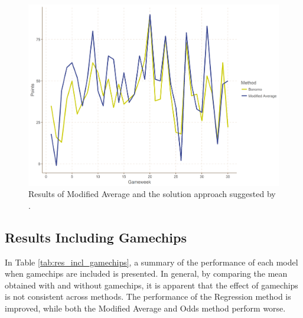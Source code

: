 \begin{figure}[H]
    \centering
    \includegraphics[scale=0.45]{fig/chapter_7/bon_gc_no_gc.png}
    \caption{Results of Modified Average and the solution approach suggested by \cite{Bonomo}.}
\label{fig:avg_vs_bon}    
\end{figure}

\begin{table}[H]
\centering
{}
\caption{Performance of Modified Average and \cite{Bonomo}.}
\label{tab:bonomo_mofidified_average}
\end{table}


\subsection{Results Including Gamechips}

In Table \ref{tab:res_incl_gamechips}, a summary of the performance of each model when gamechips are included is presented. In general, by comparing the mean obtained with and without gamechips, it is apparent that the effect of gamechips is not consistent across methods. The performance of the Regression method is improved, while both the Modified Average and Odds method perform worse.


